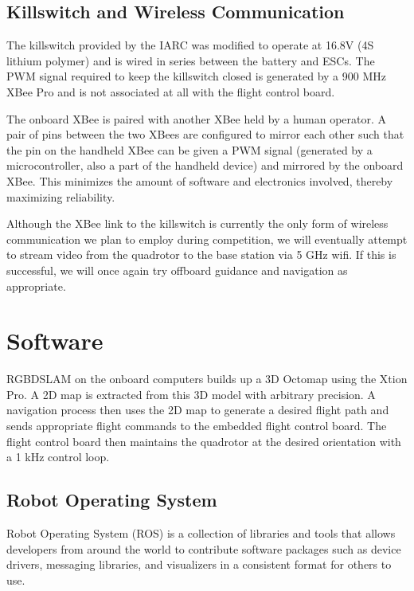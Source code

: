 \documentclass[12pt,letterpaper]{article} \usepackage[margin=1in]{geometry}
\begin{document}
\subsection*{Killswitch and Wireless Communication}

The killswitch provided by the IARC was modified to operate at 16.8V (4S
lithium polymer) and is wired in series between the battery and ESCs. The PWM
signal required to keep the killswitch closed is generated by a 900 MHz XBee
Pro and is not associated at all with the flight control board.

The onboard XBee is paired with another XBee held by a human operator. A pair
of pins between the two XBees are configured to mirror each other such that the
pin on the handheld XBee can be given a PWM signal (generated by
a microcontroller, also a part of the handheld device) and mirrored by the
onboard XBee. This minimizes the amount of software and electronics involved,
thereby maximizing reliability.

Although the XBee link to the killswitch is currently the only form of wireless
communication we plan to employ during competition, we will eventually attempt
to stream video from the quadrotor to the base station via 5 GHz wifi. If this
is successful, we will once again try offboard guidance and navigation as
appropriate.



\section*{Software}

RGBDSLAM on the onboard computers builds up a 3D Octomap using the Xtion Pro.
A 2D map is extracted from this 3D model with arbitrary precision. A navigation
process then uses the 2D map to generate a desired flight path and sends
appropriate flight commands to the embedded flight control board. The flight
control board then maintains the quadrotor at the desired orientation with
a 1 kHz control loop.


\subsection*{Robot Operating System}

Robot Operating System (ROS) is a collection of libraries and tools that allows
developers from around the world to contribute software packages such as device
drivers, messaging libraries, and visualizers in a consistent format for others
to use.
\end{document}
